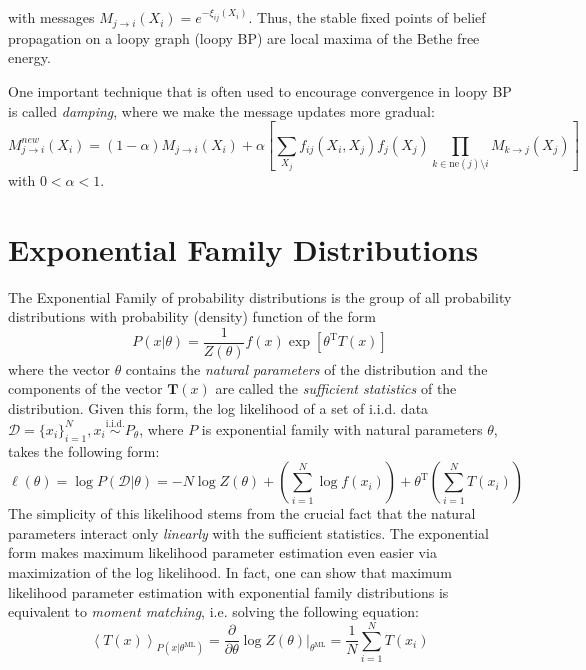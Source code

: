 \documentclass[a4paper]{article}
\begin{document}
with messages $M_{j \rightarrow i}(X_i) = e^{-\xi_{ij}(X_i)}$. Thus, the stable fixed points of belief propagation on a loopy graph (loopy BP) are local maxima of the Bethe free energy.

One important technique that is often used to encourage convergence in loopy BP is called \emph{damping}, where we make the message updates more gradual:
\[ M_{j \rightarrow i}^{new}(X_i) = (1-\alpha)M_{j \rightarrow i}(X_i) + \alpha \left[\sum_{X_j}f_{ij}(X_i,X_j)f_j(X_j)\prod_{k\in\textrm{ne}(j)\setminus i}M_{k \rightarrow j}(X_j)\right] \]
with $0 < \alpha < 1$.

\section{Exponential Family Distributions} \label{expfam}
The Exponential Family of probability distributions is the group of all probability distributions with probability (density) function of the form
\[
P(x|\theta) = \frac{1}{Z(\theta)}f(x)\exp[\theta^\textrm{T}T(x)]
\]
where the vector $\theta$ contains the \textit{natural parameters} of the distribution and the components of the vector $\mathbf{T}(x)$ are called the \textit{sufficient statistics} of the distribution. Given this form, the log likelihood of a set of i.i.d. data $\mathcal{D}=\{x_i\}_{i=1}^N, x_i\overset{\textrm{i.i.d.}}{\sim}P_\theta$, where $P$ is exponential family with natural parameters $\theta$, takes the following form:
\[
\ell(\theta) = \log P(\mathcal{D}|\theta) = -N\log Z(\theta) + \left(\sum_{i=1}^N \log f(x_i)\right) + \theta^\textrm{T}\left(\sum_{i=1}^NT(x_i)\right)
\]
The simplicity of this likelihood stems from the crucial fact that the natural parameters interact only \emph{linearly} with the sufficient statistics. The exponential form makes maximum likelihood parameter estimation even easier via maximization of the log likelihood. In fact, one can show that maximum likelihood parameter estimation with exponential family distributions is equivalent to \emph{moment matching}, i.e. solving the following equation:
\[ \left\langle T(x) \right\rangle_{P(x|\theta^\textrm{ML})} = \frac{\partial}{\partial\theta}\log Z(\theta)\Bigr|_{\theta^\textrm{ML}} = \frac{1}{N} \sum_{i=1}^N T(x_i) \]
\end{document}
